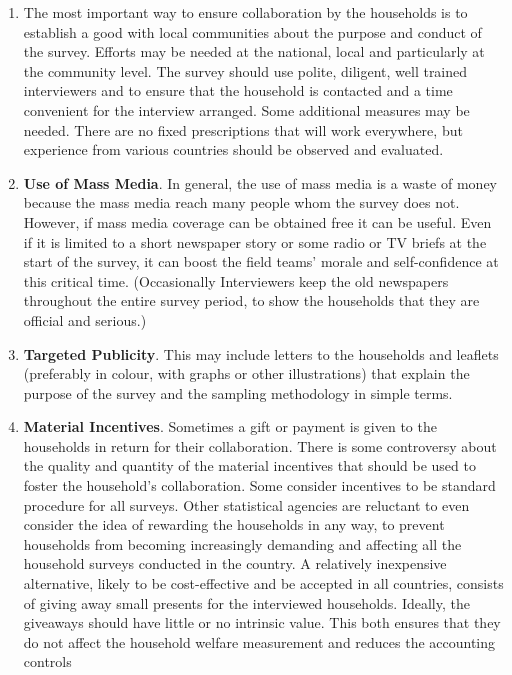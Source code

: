 \documentclass[
]{article}
\begin{document}
\begin{enumerate}
\def\labelenumi{\arabic{enumi}.}
\setcounter{enumi}{322}
\item
  The most important way to ensure collaboration by the households is
  to establish a good with local communities about the purpose and
  conduct of the survey. Efforts may be needed at the national, local
  and particularly at the community level. The survey should use
  polite, diligent, well trained interviewers and to ensure that the
  household is contacted and a time convenient for the interview
  arranged. Some additional measures may be needed. There are no fixed
  prescriptions that will work everywhere, but experience from various
  countries should be observed and evaluated.
\item
  \textbf{Use of Mass Media}. In general, the use of mass media is a waste
  of money because the mass media reach many people whom the survey
  does not. However, if mass media coverage can be obtained free it
  can be useful. Even if it is limited to a short newspaper story or
  some radio or TV briefs at the start of the survey, it can boost the
  field teams' morale and self-confidence at this critical time.
  (Occasionally Interviewers keep the old newspapers throughout the
  entire survey period, to show the households that they are official
  and serious.)
\item
  \textbf{Targeted Publicity}. This may include letters to the households
  and leaflets (preferably in colour, with graphs or other
  illustrations) that explain the purpose of the survey and the
  sampling methodology in simple terms.
\item
  \textbf{Material Incentives}. Sometimes a gift or payment is given to
  the households in return for their collaboration. There is some
  controversy about the quality and quantity of the material
  incentives that should be used to foster the household's
  collaboration. Some consider incentives to be standard procedure for
  all surveys. Other statistical agencies are reluctant to even
  consider the idea of rewarding the households in any way, to prevent
  households from becoming increasingly demanding and affecting all
  the household surveys conducted in the country. A relatively
  inexpensive alternative, likely to be cost-effective and be accepted
  in all countries, consists of giving away small presents for the
  interviewed households. Ideally, the giveaways should have little or
  no intrinsic value. This both ensures that they do not affect the
  household welfare measurement and reduces the accounting controls

\end{enumerate}
\end{document}
